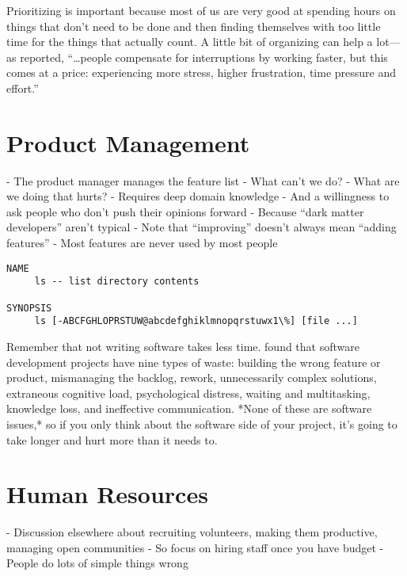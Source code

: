 \documentclass[10pt,letterpaper]{article}
\begin{document}
Prioritizing is important because most of us are very good at spending
hours on things that don't need to be done and then finding themselves
with too little time for the things that actually count. A little bit
of organizing can help a lot---as \cite{Mark2008} reported,
``{\ldots}people compensate for interruptions by working faster, but
this comes at a price: experiencing more stress, higher frustration,
time pressure and effort.''

\section{Product Management}

- The product manager manages the feature list
  - What can't we do?
  - What are we doing that hurts?
- Requires deep domain knowledge
  - And a willingness to ask people who don't push their opinions forward
  - Because ``dark matter developers'' aren't typical \cite{Hanselman2012}
- Note that ``improving'' doesn't always mean ``adding features'' \cite{Perri2018}
  - Most features are never used by most people \cite{Xu2015}

\begin{verbatim}
NAME
     ls -- list directory contents

SYNOPSIS
     ls [-ABCFGHLOPRSTUW@abcdefghiklmnopqrstuwx1\%] [file ...]
\end{verbatim}

Remember that not writing software takes less time.  \cite{Sedano2017}
found that software development projects have nine types of waste:
building the wrong feature or product, mismanaging the backlog,
rework, unnecessarily complex solutions, extraneous cognitive load,
psychological distress, waiting and multitasking, knowledge loss, and
ineffective communication.  *None of these are software issues,* so if
you only think about the software side of your project, it's going to
take longer and hurt more than it needs to.

\section{Human Resources}

- Discussion elsewhere about recruiting volunteers, making them productive, managing open communities \cite{Sholler2019}
  - So focus on hiring staff once you have budget
- People do lots of simple things wrong \cite{Behroozi2020}
\end{document}
